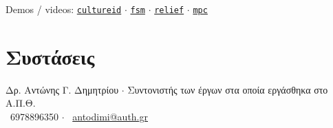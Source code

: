 \documentclass[a4paper,10pt,twoside]{article}
\begin{document}
Demos / videos: \href{https://cultureid.web.auth.gr/?page\_id=200&lang=en}{\texttt{cultureid}} $\cdot$ \href{https://www.youtube.com/watch?v=hB4qsHCEXGI}{\texttt{fsm}} $\cdot$ \href{https://relief.web.auth.gr/}{\texttt{relief}} $\cdot$ \href{https://www.youtube.com/watch?v=937OZez1iN8}{\texttt{mpc}}
\\

\section{Συστάσεις}
Δρ. Αντώνης Γ. Δημητρίου $\cdot$ Συντονιστής των έργων στα οποία εργάσθηκα στο Α.Π.Θ. \\
\faPhone \ 6978896350 $\cdot$ \faEnvelopeO \ \href{mailto:antodimi@auth.gr}{antodimi@auth.gr} \\
\end{document}
